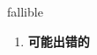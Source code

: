 
\begin{frame}
{\huge fallible}
\begin{center}
\begin{enumerate}\Large
  \item \textbf{可能出错的}
\end{enumerate}
\end{center}
\end{frame}
